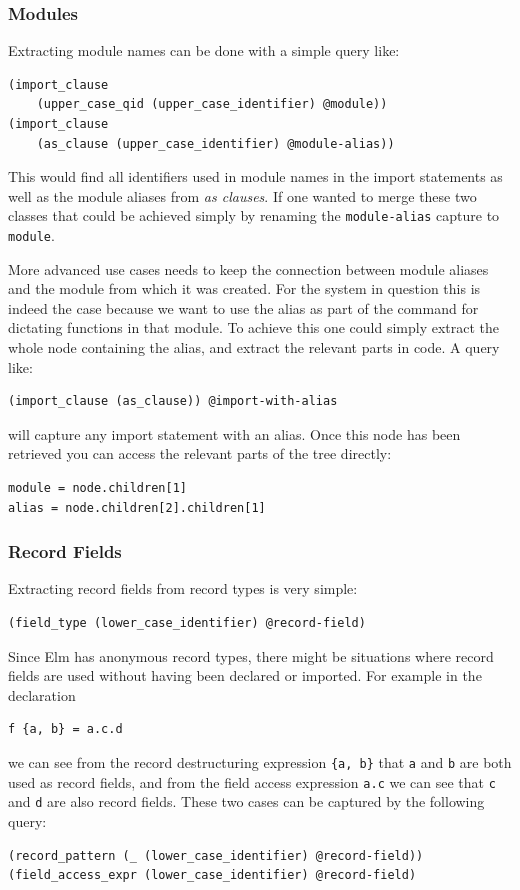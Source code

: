 \documentclass[../thesis.tex]{subfiles}
\begin{document}
\subsubsection{Modules}
Extracting module names can be done with a simple query like:
\begin{verbatim}
(import_clause 
    (upper_case_qid (upper_case_identifier) @module))
(import_clause 
    (as_clause (upper_case_identifier) @module-alias))
\end{verbatim}
This would find all identifiers used in module names in the import statements as well as the module aliases from \textit{as clauses}.
If one wanted to merge these two classes that could be achieved simply by renaming the \texttt{module-alias} capture to \texttt{module}.

More advanced use cases needs to keep the connection between module aliases and the module from which it was created.
For the system in question this is indeed the case because we want to use the alias as part of the command for dictating functions in that module.
To achieve this one could simply extract the whole node containing the alias, and extract the relevant parts in code.
A query like:
\begin{verbatim}
(import_clause (as_clause)) @import-with-alias
\end{verbatim}
will capture any import statement with an alias.
Once this node has been retrieved you can access the relevant parts of the tree directly:
\begin{verbatim}
module = node.children[1]
alias = node.children[2].children[1]
\end{verbatim}

\subsubsection{Record Fields}
Extracting record fields from record types is very simple:
\begin{verbatim}
(field_type (lower_case_identifier) @record-field)
\end{verbatim}
Since Elm has anonymous record types, there might be situations where record fields are used
without having been declared or imported.
For example in the declaration
\begin{verbatim}
f {a, b} = a.c.d
\end{verbatim}
we can see from the record destructuring expression \texttt{\{a, b\}} that \texttt{a} and \texttt{b} are both used as record fields,
and from the field access expression \texttt{a.c} we can see that \texttt{c} and \texttt{d} are also record fields.
These two cases can be captured by the following query:
\begin{verbatim}
(record_pattern (_ (lower_case_identifier) @record-field))
(field_access_expr (lower_case_identifier) @record-field)
\end{verbatim}
\end{document}
